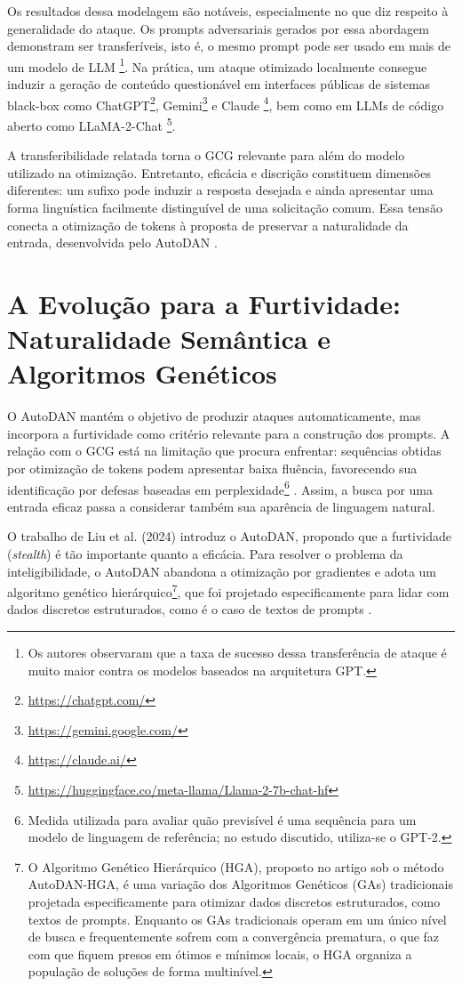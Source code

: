 Os resultados dessa modelagem são notáveis, especialmente no que diz respeito à generalidade 
do ataque. Os prompts adversariais gerados por essa abordagem demonstram ser transferíveis, 
isto é, o mesmo prompt pode ser usado em mais de um modelo de LLM 
\footnote{Os autores observaram que a taxa de sucesso dessa transferência de ataque 
é muito maior contra os modelos baseados na arquitetura GPT.}. Na prática, um ataque 
otimizado localmente consegue induzir a geração de conteúdo questionável em interfaces 
públicas de sistemas black-box como ChatGPT\footnote{\url{https://chatgpt.com/}}, 
Gemini\footnote{\url{https://gemini.google.com/}} e Claude 
\footnote{\url{https://claude.ai/}}, bem como em LLMs de código aberto como 
LLaMA-2-Chat \footnote{\url{https://huggingface.co/meta-llama/Llama-2-7b-chat-hf}}.

A transferibilidade relatada torna o GCG relevante para além do modelo utilizado na otimização. Entretanto, eficácia e discrição constituem dimensões diferentes: um sufixo pode induzir a resposta desejada e ainda apresentar uma forma linguística facilmente distinguível de uma solicitação comum. Essa tensão conecta a otimização de tokens à proposta de preservar a naturalidade da entrada, desenvolvida pelo AutoDAN \cite{liu2024autodangeneratingstealthyjailbreak}.

\section{A Evolução para a Furtividade: Naturalidade Semântica e Algoritmos Genéticos}
O AutoDAN mantém o objetivo de produzir ataques automaticamente, mas incorpora a furtividade como critério relevante para a construção dos prompts. A relação com o GCG está na limitação que procura enfrentar: sequências obtidas por otimização de tokens podem apresentar baixa fluência, favorecendo sua identificação por defesas baseadas em perplexidade\footnote{Medida utilizada para avaliar quão previsível é uma sequência para um modelo de linguagem de referência; no estudo discutido, utiliza-se o GPT-2.} \cite{liu2024autodangeneratingstealthyjailbreak}. Assim, a busca por uma entrada eficaz passa a considerar também sua aparência de linguagem natural.

O trabalho de Liu et al. (2024) \cite{liu2024autodangeneratingstealthyjailbreak} introduz 
o AutoDAN, propondo que a furtividade (\textit{stealth}) é tão importante quanto a eficácia. 
Para resolver o problema da inteligibilidade, o AutoDAN abandona a otimização por gradientes 
e adota um algoritmo genético hierárquico\footnote{O Algoritmo Genético Hierárquico (HGA), 
proposto no artigo sob o método AutoDAN-HGA, é uma variação dos Algoritmos Genéticos (GAs) 
tradicionais projetada especificamente para otimizar dados discretos estruturados, como textos 
de prompts. Enquanto os GAs tradicionais operam em um único nível de busca e frequentemente 
sofrem com a convergência prematura, o que faz com que fiquem presos em ótimos e mínimos locais, 
o HGA organiza a população de soluções de forma multinível.}, que foi projetado especificamente 
para lidar com dados discretos estruturados, como é o caso de textos de prompts 
\cite{liu2024autodangeneratingstealthyjailbreak}.

